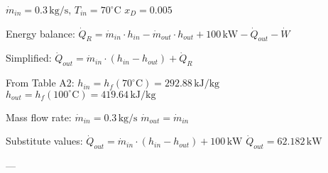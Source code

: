 \( \dot{m}_{in} = 0.3 \, \text{kg/s}, \, T_{in} = 70^\circ \text{C} \)  
\( x_D = 0.005 \)  

Energy balance:  
\( \dot{Q}_R = \dot{m}_{in} \cdot h_{in} - \dot{m}_{out} \cdot h_{out} + 100 \, \text{kW} - \dot{Q}_{out} - \dot{W} \)  

Simplified:  
\( \dot{Q}_{out} = \dot{m}_{in} \cdot (h_{in} - h_{out}) + \dot{Q}_R \)  

From Table A2:  
\( h_{in} = h_f(70^\circ \text{C}) = 292.88 \, \text{kJ/kg} \)  
\( h_{out} = h_f(100^\circ \text{C}) = 419.64 \, \text{kJ/kg} \)  

Mass flow rate:  
\( \dot{m}_{in} = 0.3 \, \text{kg/s} \)  
\( \dot{m}_{out} = \dot{m}_{in} \)  

Substitute values:  
\( \dot{Q}_{out} = \dot{m}_{in} \cdot (h_{in} - h_{out}) + 100 \, \text{kW} \)  
\( \dot{Q}_{out} = 62.182 \, \text{kW} \)  

---